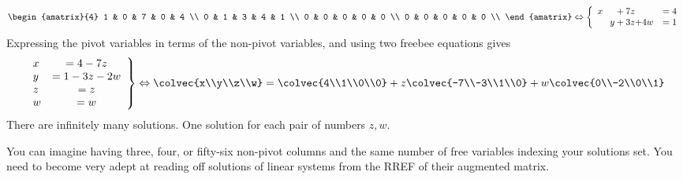 \begin{example}
 \begin{eqnarray*}
 \begin{amatrix}{4} 
1 & 0 & 7 & 0 & 4 \\ 
0 & 1 & 3 & 4 & 1 \\ 
0 & 0 & 0 & 0 & 0 \\ 
0 & 0 & 0 & 0 & 0 \\ 
\end{amatrix}
\Leftrightarrow
\left\{
\begin{array}{lcr}
	x \phantom{+y}    + 7z  \phantom{+w} & = 4 \\
	\phantom {x+}   y + 3z  {+4w} & = 1 \\
     \end{array}
     \right.
\end{eqnarray*}  
Expressing the pivot variables in terms of the non-pivot variables, and using two freebee equations gives
\begin{eqnarray*}
\left.
\begin{array}{lcr}
	x & = 4 -7z \\
	 y  & = 1 -3z-2w\\
	 z         & = z\\
	w & =w          
     \end{array}
     \right\}
     \Leftrightarrow
\colvec{x\\y\\z\\w} = \colvec{4\\1\\0\\0} + z\colvec{-7\\-3\\1\\0} + w\colvec{0\\-2\\0\\1}
\end{eqnarray*}
There are infinitely many solutions. One solution for each pair of numbers $z,w$. 
\end{example}
You can imagine having three, four, or fifty-six non-pivot columns and the same number of free variables indexing your solutions set. You need to become very adept at reading off solutions of linear systems from the RREF
of their augmented matrix. 

